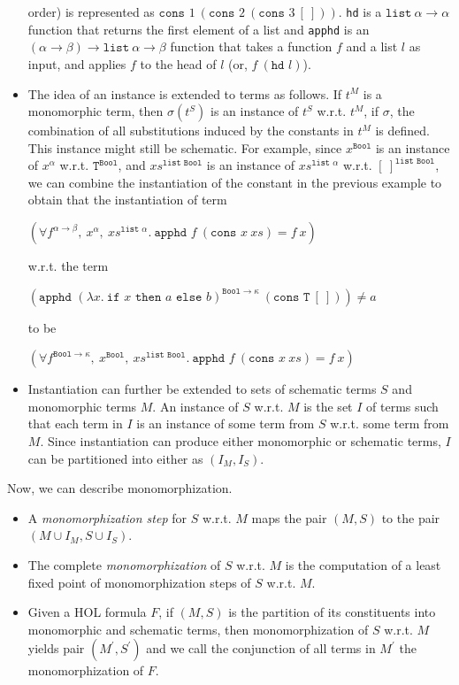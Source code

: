 \documentclass{article}
\begin{document}
\begin{itemize}
		order) is represented as 
		$\texttt{cons }1\ (\texttt{cons }2
		\ (\texttt{cons }3\ [\ ]))$.
		\texttt{hd} is a $\texttt{list}\ 
		\alpha \to \alpha$ function that 
		returns the first element of a list 
		and \texttt{apphd} is an $(\alpha
		\to \beta) \to \texttt{list}\
		\alpha \to \beta$ function that
		takes a function $f$ and a list 
		$l$ as input, and applies $f$
		to the head of $l$ (or, $f\ 
		(\texttt{hd }l)$).
		\item The idea of an instance is 
		extended to terms as follows. If 
		$t^M$ is a monomorphic term, then 
		$\sigma(t^S)$ is an instance of 
		$t^S$ w.r.t. $t^M$, if 
		$\sigma$, the combination of all 
		substitutions induced by the 
		constants in $t^M$ is defined. This 
		instance might still be schematic. For 
		example, since $x^{\texttt{Bool}}$ is 
		an instance of $x^{\alpha}$ w.r.t.
		$\texttt{T}^{\texttt{Bool}}$, 
		and $xs^{\texttt{list Bool}}$ is 
		an instance of 
		$xs^{\texttt{list }\alpha}$ 
		w.r.t. $[\ ]^{\texttt{list Bool}}$,
		we can combine the instantiation 
		of the constant in the previous 
		example to obtain that the 
		instantiation of term
		\begin{center}
			$(\forall f^{\alpha \to \beta},\ 
			x^{\alpha},\ xs^{\texttt{list }
				\alpha}.\ \texttt{apphd }f\ 
			(\texttt{cons }x\ xs) = f\ x)$
		\end{center}
		w.r.t. the term
		\begin{center}
			$(\texttt{apphd }(\lambda 
			x.\ \texttt{if }x\texttt{ then }
			a \texttt{ else } b)^{\texttt{Bool} 
				\to \kappa}\ (\texttt{cons T}\ 
			[\ ])) \neq a$
		\end{center}
		to be
		\begin{center}
			$(\forall f^{\texttt{Bool}
				\to \kappa},\ x^{\texttt{Bool}},
			\ xs^{\texttt{list Bool}}.\ 
			\texttt{apphd }f\ (\texttt{cons }x
			\ xs) = f\ x)$
		\end{center}
		\item Instantiation can further be 
		extended to sets of schematic 
		terms $S$ and monomorphic terms $M$. 
		An instance of $S$ w.r.t. 
		$M$ is the set $I$ of terms such 
		that each term in $I$ is an instance 
		of some term from $S$ w.r.t. 
		some term from $M$. Since 
		instantiation can produce either 
		monomorphic or schematic terms, $I$
		can be partitioned into either as
		$(I_M, I_S)$.
	\end{itemize}
	Now, we can describe monomorphization.
	\begin{itemize}
		\item A \textit{monomorphization 
			step} for $S$ w.r.t. $M$ maps 
		the pair $(M,S)$ to the pair 
		$(M \cup I_M, S \cup I_S)$.
		\item The complete 
		\textit{monomorphization} of $S$ 
		w.r.t. $M$ is the computation of 
		a least fixed point of 
		monomorphization steps of $S$ 
		w.r.t. $M$.
		\item Given a HOL formula $F$, 
		if $(M, S)$ is the partition of its 
		constituents into monomorphic and 
		schematic terms, then 
		monomorphization of $S$ 
		w.r.t. $M$ yields pair 
		$(M^{\prime}, S^{\prime})$ and we 
		call the conjunction of all terms in 
		$M^{\prime}$ the monomorphization 
		of $F$.
	\end{itemize}
\end{document}

